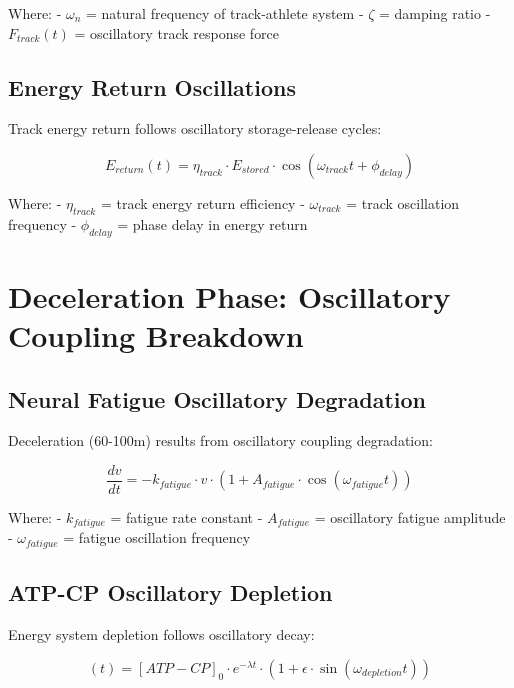 \documentclass[12pt]{article}
\begin{document}
Where:
- $\omega_n$ = natural frequency of track-athlete system
- $\zeta$ = damping ratio
- $F_{track}(t)$ = oscillatory track response force

\subsection{Energy Return Oscillations}

Track energy return follows oscillatory storage-release cycles:

\begin{equation}
E_{return}(t) = \eta_{track} \cdot E_{stored} \cdot \cos(\omega_{track}t + \phi_{delay})
\end{equation}

Where:
- $\eta_{track}$ = track energy return efficiency
- $\omega_{track}$ = track oscillation frequency  
- $\phi_{delay}$ = phase delay in energy return

\section{Deceleration Phase: Oscillatory Coupling Breakdown}

\subsection{Neural Fatigue Oscillatory Degradation}

Deceleration (60-100m) results from oscillatory coupling degradation:

\begin{equation}
\frac{dv}{dt} = -k_{fatigue} \cdot v \cdot \left(1 + A_{fatigue} \cdot \cos(\omega_{fatigue}t)\right)
\end{equation}

Where:
- $k_{fatigue}$ = fatigue rate constant
- $A_{fatigue}$ = oscillatory fatigue amplitude
- $\omega_{fatigue}$ = fatigue oscillation frequency

\subsection{ATP-CP Oscillatory Depletion}

Energy system depletion follows oscillatory decay:

\begin{equation}
[ATP-CP](t) = [ATP-CP]_0 \cdot e^{-\lambda t} \cdot \left(1 + \epsilon \cdot \sin(\omega_{depletion}t)\right)
\end{equation}
\end{document}
